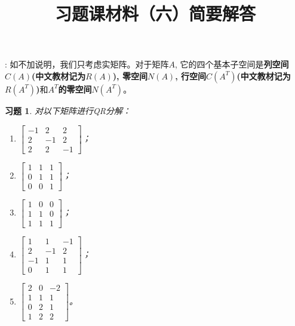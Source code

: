 \documentclass[UTF8]{ctexart}
\newtheorem{ex}[thm]{习题}
\begin{document}
\title{习题课材料（六）简要解答}

\date{}

\maketitle

\vspace{-1cm}



\medskip

: 如不加说明，我们只考虑实矩阵。对于矩阵$A$, 它的四个基本子空间是{\bf 列空间$C(A)$(中文教材记为$R(A)$), 零空间$N(A)$, 行空间$C(A^T)$(中文教材记为$R(A^T)$)}和{\bf $A^T$的零空间$N(A^T)$}。
\medskip



\begin{ex}
对以下矩阵进行QR分解：
\begin{enumerate}
\item $\begin{bmatrix}-1&2&2\\2&-1&2\\2&2&-1\end{bmatrix}$；
\item $\begin{bmatrix}1&1&1\\0&1&1\\0&0&1\end{bmatrix}$；
\item $\begin{bmatrix}1&0&0\\1&1&0\\1&1&1\end{bmatrix}$；
\item $\begin{bmatrix}1&1&-1\\2&-1&2\\-1&1&1\\0&1&1\end{bmatrix}$；
\item $\begin{bmatrix}2&0&-2\\1&1&1\\0&2&1\\1&2&2\end{bmatrix}$。
\end{enumerate}
\end{ex}
\end{document}
